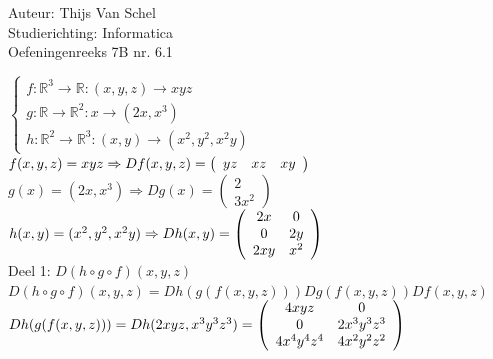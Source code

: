 \documentclass[a4paper]{article}
\begin{document}
  
\noindent \large Auteur: Thijs Van Schel \\
\noindent \large Studierichting: Informatica\\
\noindent \large Oefeningenreeks 7B nr. 6.1\\

\medskip

\normalsize

$
\left\{ 
\begin{array}{l} 
f : \mathbb{R}^3 \rightarrow \mathbb{R} : (x,y,z) \rightarrow xyz\\

g : \mathbb{R} \rightarrow \mathbb{R}^2 : x \rightarrow \left(2x, x^3\right)\\

h : \mathbb{R}^2 \rightarrow \mathbb{R}^3 : (x,y) \rightarrow \left(x^2, y^2, x^2y\right)
\end{array} 
\right.
$\\

$f(x,y,z) = xyz \Rightarrow Df(x,y,z) = \left(\begin{array}{c c c} yz & xz & xy \end{array}\right)$\\

$g(x) = (2x, x^3) \Rightarrow Dg(x) = \left(\begin{array}{c} 2 \\ 3x^2 \end{array}\right)$\\

$h(x,y) = (x^2, y^2, x^2y) \Rightarrow Dh(x,y) = \left(\begin{array}{c c} 2x & 0 \\ 0 & 2y \\ 2xy & x^2 \end{array}\right)$\\

Deel 1: $D(h \circ g \circ f)(x,y,z)$\\

$D(h \circ g \circ f)(x,y,z) = Dh(g(f(x,y,z)))   Dg(f(x,y,z))   Df(x,y,z)$\\

$Dh(g(f(x,y,z))) = Dh(2xyz, x^3y^3z^3) = \left(\begin{array}{c c} 4xyz & 0 \\ 0 & 2x^3y^3z^3 \\ 4x^4y^4z^4 & 4x^2y^2z^2 \end{array}\right)$\\
\end{document}
